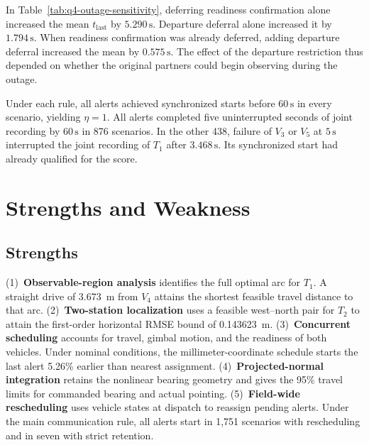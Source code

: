 \documentclass{swmcmthesis}
\begin{document}
In Table~\ref{tab:q4-outage-sensitivity}, deferring readiness confirmation alone increased the mean \(t_{\mathrm{last}}\) by \(5.290\,\mathrm s\). Departure deferral alone increased it by \(1.794\,\mathrm s\). When readiness confirmation was already deferred, adding departure deferral increased the mean by \(0.575\,\mathrm s\). The effect of the departure restriction thus depended on whether the original partners could begin observing during the outage.

Under each rule, all alerts achieved synchronized starts before \(60\,\mathrm s\) in every scenario, yielding \(\eta=1\). All alerts completed five uninterrupted seconds of joint recording by \(60\,\mathrm s\) in 876 scenarios. In the other 438, failure of \(V_3\) or \(V_5\) at \(5\,\mathrm s\) interrupted the joint recording of \(T_1\) after \(3.468\,\mathrm s\). Its synchronized start had already qualified for the score.

\section{Strengths and Weakness}

\subsection{Strengths}

\noindent\hspace*{\parindent}(1)~\textbf{Observable-region analysis} identifies the full optimal arc for \(T_1\). A straight drive of 3.673~m from \(V_4\) attains the shortest feasible travel distance to that arc.
(2)~\textbf{Two-station localization} uses a feasible west--north pair for \(T_2\) to attain the first-order horizontal RMSE bound of 0.143623~m.
(3)~\textbf{Concurrent scheduling} accounts for travel, gimbal motion, and the readiness of both vehicles. Under nominal conditions, the millimeter-coordinate schedule starts the last alert 5.26\% earlier than nearest assignment.
(4)~\textbf{Projected-normal integration} retains the nonlinear bearing geometry and gives the 95\% travel limits for commanded bearing and actual pointing.
(5)~\textbf{Field-wide rescheduling} uses vehicle states at dispatch to reassign pending alerts. Under the main communication rule, all alerts start in 1,751 scenarios with rescheduling and in seven with strict retention.
\end{document}
